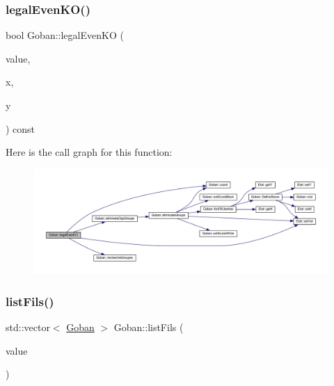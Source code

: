\subsubsection{\texorpdfstring{legal\+Even\+K\+O()}{legalEvenKO()}}
{\footnotesize\ttfamily bool Goban\+::legal\+Even\+KO (\begin{DoxyParamCaption}\item[{const \hyperlink{class_etat_af3ddb2296ffc379b7f3ad2bf832f294e}{Etat\+::\+V\+AL} \&}]{value,  }\item[{const int \&}]{x,  }\item[{const int \&}]{y }\end{DoxyParamCaption}) const}

Here is the call graph for this function\+:
\nopagebreak
\begin{figure}[H]
\begin{center}
\leavevmode
\includegraphics[width=350pt]{class_goban_a799390f04139eec16f7bb8c79b381303_cgraph}
\end{center}
\end{figure}
\mbox{\label{class_goban_a36ab256c9430e070b620052a0f13f051}} 
\subsubsection{\texorpdfstring{list\+Fils()}{listFils()}}
{\footnotesize\ttfamily std\+::vector$<$ \hyperlink{class_goban}{Goban} $>$ Goban\+::list\+Fils (\begin{DoxyParamCaption}\item[{const \hyperlink{class_etat_af3ddb2296ffc379b7f3ad2bf832f294e}{Etat\+::\+V\+AL}}]{value }\end{DoxyParamCaption})}

